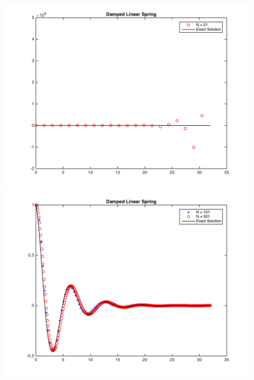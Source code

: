 \documentclass[11pt, oneside]{article}
\begin{document}
\begin{enumerate}
\begin{center}
      \includegraphics[scale=.4]{Figures/01_23.png}
      \includegraphics[scale=.7]{Figures/01_24.png}
    \end{center}
\end{enumerate}
\end{document}
